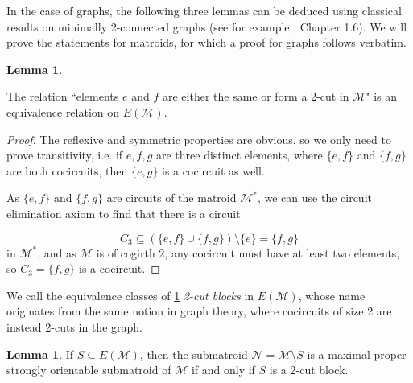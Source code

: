 \documentclass[12pt]{report}
\theoremstyle{definition}
\newtheorem{lemma}[theorem]{Lemma}
\def\calM{\mathcal M}
\def\calN{\mathcal N}
\theoremstyle{upright}
\begin{document}
In the case of graphs, the following three lemmas can be deduced using classical results on minimally 2-connected graphs (see for example \cite{Bol}, Chapter 1.6).
We will prove the statements for matroids, for which a proof for graphs follows verbatim.

\begin{lemma}\label{lem:2CutEquivalence}

    The relation ``elements $e$ and $f$ are either the same or form a 2-cut in $\calM$" is an equivalence relation on $E(\calM)$.

\end{lemma}

\begin{proof}

    The reflexive and symmetric properties are obvious, so we only need to prove transitivity, i.e. if $e, f, g$ are three distinct elements, where $\{e, f\}$ and $\{f, g\}$ are both cocircuits, then $\{e, g\}$ is a cocircuit as well.

    As $\{e, f\}$ and $\{f, g\}$ are circuits of the matroid $\calM^*$, we can use the circuit elimination axiom to find that there is a circuit
    
    \[C_3\subseteq(\{e, f\}\cup\{f, g\})\setminus\{e\}=\{f, g\}\]
    in $\calM^*$, and as $\calM$ is of cogirth $2$, any cocircuit must have at least two elements, so $C_3=\{f, g\}$ is a cocircuit.
    
\end{proof}

We call the equivalence classes of \cref{lem:2CutEquivalence} \textit{2-cut blocks} in $E(\calM)$, whose name originates from the same notion in graph theory, where cocircuits of size 2 are instead 2-cuts in the graph.

\begin{lemma}

    If $S\subseteq E(\calM)$, then the submatroid $\calN=\calM\setminus S$ is a maximal proper strongly orientable submatroid of $\calM$ if and only if $S$ is a 2-cut block.
    
\end{lemma}
\end{document}
